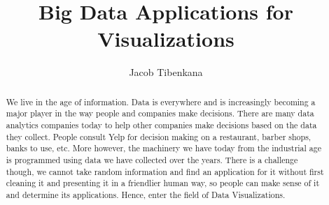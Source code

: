\documentclass[sigconf]{acmart}
\begin{document}
\title{Big Data Applications for Visualizations}


\author{Jacob Tibenkana}

\renewcommand{\shortauthors}{J. Tibenkana}


\begin{abstract}
We live in the age of information. Data is everywhere and is increasingly becoming a major player in the way people and companies make decisions. There are many data analytics companies today to help other companies make decisions based on the data they collect. People consult Yelp for decision making on a restaurant, barber shops, banks to use, etc. More however, the machinery we have today from the industrial age is programmed using data we have collected over the years. There is a challenge though, we cannot take random information and find an application for it without first cleaning it and presenting it in a friendlier human way, so people can make sense of it and determine its applications. Hence, enter the field of Data Visualizations. 
\end{abstract}


\maketitle

\end{document}
